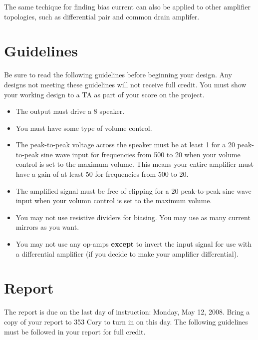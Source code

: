 \documentclass{article}
\begin{document}
The same techique for finding bias current can also be applied to other amplifier topologies, such as differential pair and common drain amplifer.

\section{Guidelines}

Be sure to read the following guidelines before beginning your design. Any designs not meeting these guidelines will not receive full credit. You must show your working design to a TA as part of your score on the project.

\begin{itemize}
  \item The output must drive a \unit{8}{\ohm} speaker.
  \item You must have some type of volume control.
  \item The peak-to-peak voltage across the speaker must be at least \unit{1}{\volt} for a \unit{20}{\milli\volt} peak-to-peak sine wave input for frequencies from \unit{500}{\hertz} to \unit{20}{\kilo\hertz} when your volume control is set to the maximum volume. This means your entire amplifier must have a gain of at least 50 for frequencies from \unit{500}{\hertz} to \unit{20}{\kilo\hertz}.
  \item The amplified signal must be free of clipping for a \unit{20}{\milli\volt} peak-to-peak sine wave input when your volumn control is set to the maximum volume.
  \item You may not use resistive dividers for biasing. You may use as many current mirrors as you want.
  \item You may not use any op-amps \textbf{except} to invert the input signal for use with a differential amplifier (if you decide to make your amplifier differential).
\end{itemize}

\section{Report}

The report is due on the last day of instruction: Monday, May 12, 2008. Bring a copy of your report to 353 Cory to turn in on this day. The following guidelines must be followed in your report for full credit.
\end{document}
